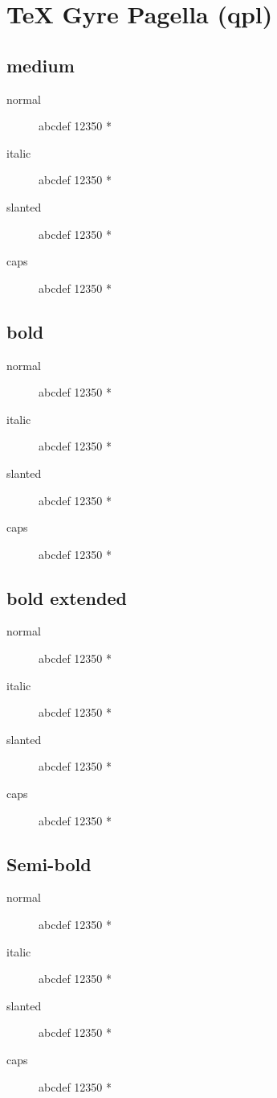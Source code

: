 \section{\TeX{} Gyre Pagella (qpl)}

\subsection{medium}
\begin{description}
    \item [normal]  abcdef 12350 *
    \item [italic]  abcdef 12350 *
    \item [slanted]  abcdef 12350 *
    \item [caps]  abcdef 12350 *
\end{description}
    
\subsection{bold}
\begin{description}
    \item [normal]  abcdef 12350 *
    \item [italic]  abcdef 12350 *
    \item [slanted]  abcdef 12350 *
    \item [caps]  abcdef 12350 *
\end{description}
    
\subsection{bold extended}
\begin{description}
    \item [normal]  abcdef 12350 *
    \item [italic]  abcdef 12350 *
    \item [slanted]  abcdef 12350 *
    \item [caps]  abcdef 12350 *
\end{description}

\subsection{Semi-bold}
\begin{description}
    \item [normal]  abcdef 12350 *
    \item [italic]  abcdef 12350 *
    \item [slanted]  abcdef 12350 *
    \item [caps]  abcdef 12350 *
\end{description}


